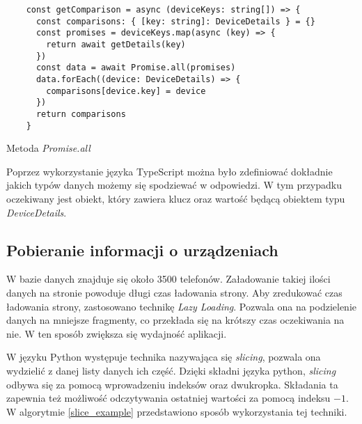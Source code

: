 \begin{code}[H]
  \begin{verbatim}
    const getComparison = async (deviceKeys: string[]) => {
      const comparisons: { [key: string]: DeviceDetails } = {}
      const promises = deviceKeys.map(async (key) => {
        return await getDetails(key)
      })
      const data = await Promise.all(promises)
      data.forEach((device: DeviceDetails) => {
        comparisons[device.key] = device
      })
      return comparisons
    }
  \end{verbatim}
  \caption{Metoda \textit{Promise.all}}
  \label{getting_devices}
\end{code}
Poprzez wykorzystanie języka TypeScript można było zdefiniować dokładnie jakich typów danych możemy się spodziewać w odpowiedzi. W tym przypadku oczekiwany jest obiekt, który zawiera klucz oraz wartość będącą obiektem typu \textit{DeviceDetails}. 

\subsection{Pobieranie informacji o urządzeniach}
W bazie danych znajduje się około 3500 telefonów. Załadowanie takiej ilości danych na stronie powoduje długi czas ładowania strony. Aby zredukować czas ładowania strony, zastosowano technikę \textit{Lazy Loading}. Pozwala ona na podzielenie danych na mniejsze fragmenty, co przekłada się na krótszy czas oczekiwania na nie. W ten sposób zwiększa się wydajność aplikacji.

W języku Python występuje technika nazywająca się \textit{slicing}, pozwala ona wydzielić z danej listy danych ich część. Dzięki składni języka python, \textit{slicing} odbywa się za pomocą wprowadzeniu indeksów oraz dwukropka. Składania ta zapewnia też możliwość odczytywania ostatniej wartości za pomocą indeksu $-1$. W algorytmie \linebreak \ref{slice_example} przedstawiono sposób wykorzystania tej techniki.

